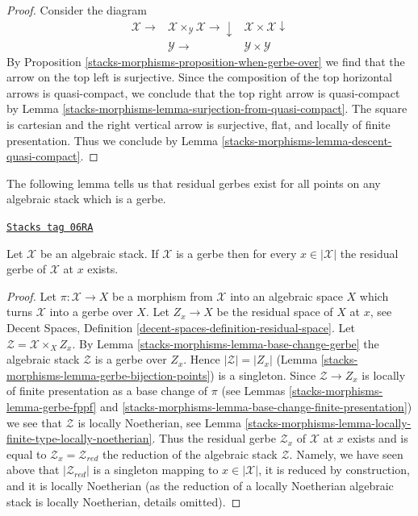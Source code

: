 \begin{proof}
Consider the diagram
$$
\begin{array}{ccc}\mathcal{X} \longrightarrow & \mathcal{X} \times_\mathcal{Y} \mathcal{X} \longrightarrow\downarrow & \mathcal{X} \times \mathcal{X} \downarrow \\  & \mathcal{Y} \longrightarrow & \mathcal{Y} \times \mathcal{Y}\end{array}
$$
By Proposition \ref{stacks-morphisms-proposition-when-gerbe-over} we find that
the arrow on the top left is surjective. Since the composition
of the top horizontal arrows is quasi-compact, we conclude
that the top right arrow is quasi-compact by
Lemma \ref{stacks-morphisms-lemma-surjection-from-quasi-compact}.
The square is cartesian and the right vertical arrow is
surjective, flat, and locally of finite presentation.
Thus we conclude by Lemma \ref{stacks-morphisms-lemma-descent-quasi-compact}.
\end{proof}

The following lemma tells us that residual gerbes exist for all points
on any algebraic stack which is a gerbe.

\begin{lemma}
\label{stacks-morphisms-lemma-gerbe-residual-gerbe-exists}
\href{https://stacks.math.columbia.edu/tag/06RA}{\texttt{Stacks tag 06RA}}

Let $\mathcal{X}$ be an algebraic stack. If $\mathcal{X}$ is a gerbe
then for every $x \in |\mathcal{X}|$ the residual gerbe of $\mathcal{X}$
at $x$ exists.
\end{lemma}

\begin{proof}
Let $\pi : \mathcal{X} \to X$ be a morphism from $\mathcal{X}$ into
an algebraic space $X$ which turns $\mathcal{X}$ into a gerbe over $X$.
Let $Z_x \to X$ be the residual space of $X$ at $x$, see
Decent Spaces, Definition \ref{decent-spaces-definition-residual-space}.
Let $\mathcal{Z} = \mathcal{X} \times_X Z_x$. By
Lemma \ref{stacks-morphisms-lemma-base-change-gerbe}
the algebraic stack $\mathcal{Z}$ is a gerbe over $Z_x$.
Hence $|\mathcal{Z}| = |Z_x|$
(Lemma \ref{stacks-morphisms-lemma-gerbe-bijection-points})
is a singleton. Since $\mathcal{Z} \to Z_x$ is locally of finite presentation
as a base change of $\pi$ (see
Lemmas \ref{stacks-morphisms-lemma-gerbe-fppf} and \ref{stacks-morphisms-lemma-base-change-finite-presentation})
we see that $\mathcal{Z}$ is locally Noetherian, see
Lemma \ref{stacks-morphisms-lemma-locally-finite-type-locally-noetherian}.
Thus the residual gerbe $\mathcal{Z}_x$ of $\mathcal{X}$ at $x$
exists and is equal to $\mathcal{Z}_x = \mathcal{Z}_{red}$ the reduction
of the algebraic stack $\mathcal{Z}$. Namely, we have seen above
that $|\mathcal{Z}_{red}|$ is a singleton mapping to $x \in |\mathcal{X}|$,
it is reduced by construction, and it is locally Noetherian (as the
reduction of a locally Noetherian algebraic stack is locally Noetherian,
details omitted).
\end{proof}

